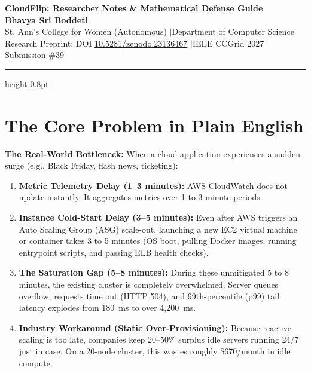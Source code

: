 \documentclass[11pt,letterpaper]{article}
\begin{document}
\begin{center}
  {\LARGE \textbf{CloudFlip: Researcher Notes \& Mathematical Defense Guide}} \\[4pt]
  {\large \textbf{Bhavya Sri Boddeti}} \\[2pt]
  {\small St. Ann's College for Women (Autonomous) \quad$|$\quad Department of Computer Science} \\[2pt]
  {\small Research Preprint: DOI \href{https://doi.org/10.5281/zenodo.23136467}{10.5281/zenodo.23136467} \quad$|$\quad IEEE CCGrid 2027 Submission \#39}
\end{center}

\vspace{2pt}
\hrule height 0.8pt
\vspace{8pt}

\section{The Core Problem in Plain English}
\textbf{The Real-World Bottleneck:} When a cloud application experiences a sudden surge (e.g., Black Friday, flash news, ticketing):
\begin{enumerate}[itemsep=1pt]
  \item \textbf{Metric Telemetry Delay (1--3 minutes):} AWS CloudWatch does not update instantly. It aggregates metrics over 1-to-3-minute periods.
  \item \textbf{Instance Cold-Start Delay (3--5 minutes):} Even after AWS triggers an Auto Scaling Group (ASG) scale-out, launching a new EC2 virtual machine or container takes 3 to 5 minutes (OS boot, pulling Docker images, running entrypoint scripts, and passing ELB health checks).
  \item \textbf{The Saturation Gap (5--8 minutes):} During these unmitigated 5 to 8 minutes, the existing cluster is completely overwhelmed. Server queues overflow, requests time out (HTTP 504), and 99th-percentile (p99) tail latency explodes from 180~ms to over 4,200~ms.
  \item \textbf{Industry Workaround (Static Over-Provisioning):} Because reactive scaling is too late, companies keep 20--50\% surplus idle servers running 24/7 just in case. On a 20-node cluster, this wastes roughly \$670/month in idle compute.
\end{enumerate}
\end{document}
